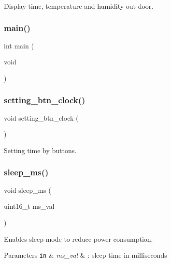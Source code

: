 Display time, temperature and humidity out door. 

\mbox{\label{main_8c_a840291bc02cba5474a4cb46a9b9566fe}} 
\subsubsection{main()}
{\footnotesize\ttfamily int main (\begin{DoxyParamCaption}\item[{void}]{ }\end{DoxyParamCaption})}

\mbox{\label{main_8c_a685d2aedb9c7384e404ba001e0f193af}} 
\subsubsection{setting\+\_\+btn\+\_\+clock()}
{\footnotesize\ttfamily void setting\+\_\+btn\+\_\+clock (\begin{DoxyParamCaption}{ }\end{DoxyParamCaption})}



Setting time by buttons. 

\mbox{\label{main_8c_a655422e1c9d3a81a192c3aac9e34c1f9}} 
\subsubsection{sleep\+\_\+ms()}
{\footnotesize\ttfamily void sleep\+\_\+ms (\begin{DoxyParamCaption}\item[{uint16\+\_\+t}]{ms\+\_\+val }\end{DoxyParamCaption})}



Enables sleep mode to reduce power consumption. 


\begin{DoxyParams}[1]{Parameters}
\mbox{\tt in}  & {\em ms\+\_\+val} & \+: sleep time in milliseconds \\
\hline
\end{DoxyParams}
\mbox{\label{main_8c_ac53933fe2f1dae541f29b07fdbdd48d1}} 
